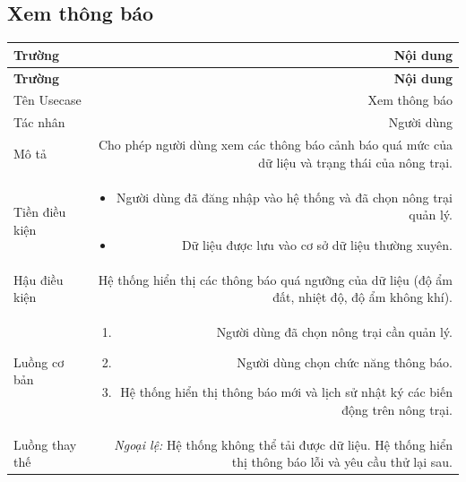 \subsection{Xem thông báo}
 
\begin{longtable}{|L|R|}
 
\hline
\textbf{Trường} & \textbf{Nội dung} \\ \hline
 
\endfirsthead
 
\hline
\textbf{Trường} & \textbf{Nội dung} \\ \hline
 
\endhead
 
\endfoot
 
Tên Usecase & Xem thông báo \\[4pt] \hline
 
Tác nhân & Người dùng \\[4pt] \hline
 
Mô tả & Cho phép người dùng xem các thông báo cảnh báo quá mức của dữ liệu và trạng thái của nông trại. \\[4pt] \hline
 
Tiền điều kiện &
\begin{itemize}[leftmargin=*, nosep, topsep=2pt]
  \item Người dùng đã đăng nhập vào hệ thống và đã chọn nông trại quản lý.
  \item Dữ liệu được lưu vào cơ sở dữ liệu thường xuyên.
\end{itemize} \\[4pt] \hline
 
Hậu điều kiện & Hệ thống hiển thị các thông báo quá ngưỡng của dữ liệu (độ ẩm đất, nhiệt độ, độ ẩm không khí). \\[4pt] \hline
 
Luồng cơ bản &
\begin{enumerate}[leftmargin=*, nosep, topsep=2pt]
  \item Người dùng đã chọn nông trại cần quản lý.
  \item Người dùng chọn chức năng thông báo.
  \item Hệ thống hiển thị thông báo mới và lịch sử nhật ký các biến động trên nông trại.
\end{enumerate} \\[4pt] \hline
 
Luồng thay thế &
\textit{Ngoại lệ:} Hệ thống không thể tải được dữ liệu.
Hệ thống hiển thị thông báo lỗi và yêu cầu thử lại sau. \\[4pt] \hline
 
\end{longtable}
 